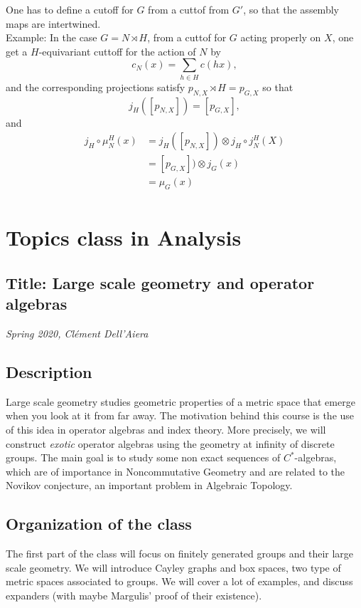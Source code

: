 One has to define a cutoff for $G$ from a cuttof from $G'$, so that the assembly maps are intertwined.\\

Example: In the case $G=N\rtimes H$, from a cuttof for $G$ acting properly on $X$, one get a $H$-equivariant cuttoff for the action of $N$ by 
\[c_N (x) =\sum_{h\in H} c(hx),\]
and the corresponding projections satisfy $p_{N,X} \rtimes H = p_{G,X}$ so that 
\[ j_H([p_{N,X}]) = [p_{G,X}],\]
and
\[\begin{split}
j_H \circ\mu_N^H(x) & = j_H([p_{N,X}]) \otimes j_H\circ j^H_N(X) \\
			& = [p_{G,X}]) \otimes j_G(x)\\
			&= \mu_G(x)\\
\end{split}\]
\newpage

\section{Topics class in Analysis}

\subsection*{Title: Large scale geometry and operator algebras}
\textit{Spring 2020, Cl\'ement Dell'Aiera}
\subsection*{Description} 
Large scale geometry studies geometric properties of a metric space that emerge when you look at it from far away. The motivation behind this course is the use of this idea in operator algebras and index theory. More precisely, we will construct \textit{exotic} operator algebras using the geometry at infinity of discrete groups. The main goal is to study some non exact sequences of $C^*$-algebras, which are of importance in Noncommutative Geometry and are related to the Novikov conjecture, an important problem in Algebraic Topology.

\subsection*{Organization of the class}
The first part of the class will focus on finitely generated groups and their large scale geometry. We will introduce Cayley graphs and box spaces, two type of metric spaces associated to groups. We will cover a lot of examples, and discuss expanders (with maybe Margulis' proof of their existence).\\

